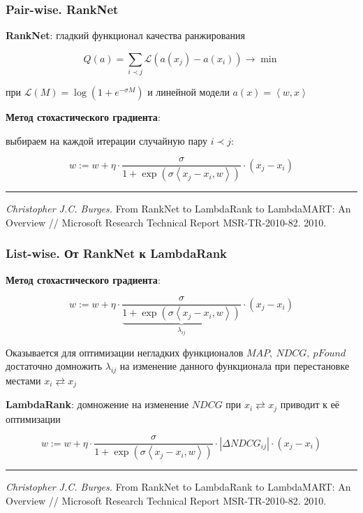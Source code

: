 \documentclass[fullscreen=true, bookmarks=true, hyperref={pdfencoding=unicode}]{beamer}
\begin{document}
\begin{frame}
  \frametitle{Pair-wise. RankNet}

  {\bf RankNet}: гладкий функционал качества ранжирования

  $$ Q(a) = \sum\limits_{i \prec j} \mathcal{L}(a(x_j) - a(x_i)) \to \min $$

  при $\mathcal{L}(M) = \log(1 + e^{-\sigma M})$ и линейной модели $a(x) = \left< w, x\right>$

  \vspace{0.5cm}
  {\bf Метод стохастического градиента}:

  выбираем на каждой итерации случайную пару $i \prec j$:

  $$ w := w + \eta \cdot \frac{\sigma}{1 + \exp(\sigma \left< x_j - x_i, w\right>)} \cdot (x_j - x_i)$$

  \noindent\rule{8cm}{0.4pt}

  {\small
  {\it Christopher J.C. Burges.} From RankNet to LambdaRank to LambdaMART: An Overview // Microsoft Research Technical Report MSR-TR-2010-82. 2010.}
\end{frame}


\begin{frame}
  \frametitle{List-wise. От RankNet к LambdaRank}

  {\bf Метод стохастического градиента}:

  $$ w := w + \eta \cdot \frac{\sigma}{\underbrace{1 + \exp(\sigma \left< x_j - x_i, w\right>)}_{\lambda_{ij}} } \cdot (x_j - x_i)$$

  Оказывается для оптимизации негладких функционалов $MAP,\ NDCG,\  pFound$ достаточно домножить $\lambda_{ij}$ на изменение данного функционала при перестановке местами $x_i  \rightleftarrows x_j$

  {\bf LambdaRank}: домножение на изменение $NDCG$ при $x_i  \rightleftarrows x_j$ приводит к её оптимизации

  $$ w := w + \eta \cdot \frac{\sigma}{1 + \exp(\sigma \left< x_j - x_i, w\right>)}\cdot |\Delta NDCG_{ij}| \cdot (x_j - x_i)$$

  \noindent\rule{8cm}{0.4pt}

  {\small
  {\it Christopher J.C. Burges.} From RankNet to LambdaRank to LambdaMART: An Overview // Microsoft Research Technical Report MSR-TR-2010-82. 2010.}
\end{frame}
\end{document}
